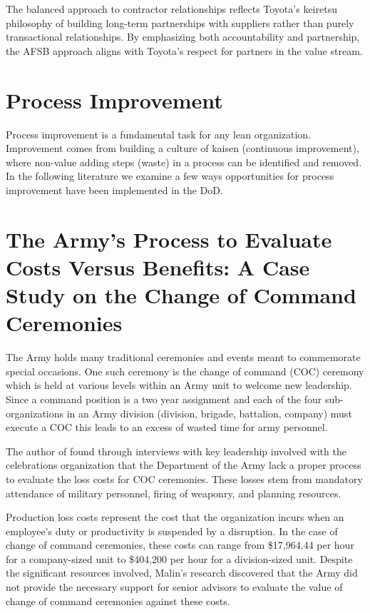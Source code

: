 \documentclass{article}
\begin{document}
		The balanced approach to contractor relationships reflects Toyota's keiretsu philosophy of building long-term partnerships with suppliers rather than purely transactional relationships. 
		By emphasizing both accountability and partnership, the AFSB approach aligns with Toyota's respect for partners in the value stream. 

	\section{Process Improvement}

		Process improvement is a fundamental task for any lean organization. 
		Improvement comes from building a culture of kaisen (continuous improvement), where non-value adding steps (waste) in a process can be identified and removed. In the following literature we examine a few ways opportunities for process improvement have been implemented in the DoD.

		\section{The Army's Process to Evaluate Costs Versus Benefits: A Case Study on the Change of Command Ceremonies \cite{Malin2020}}

			The Army holds many traditional ceremonies and events meant to commemorate special occasions. 
			One such ceremony is the change of command (COC) ceremony which is held at various levels within an Army unit to welcome new leadership. 
			Since a command position is a two year assignment and each of the four sub-organizations in an Army division (division, brigade, battalion, company) must execute a COC this leads to an excess of wasted time for army personnel.

			The author of \cite{Malin2020} found through interviews with key leadership involved with the celebrations organization that the Department of the Army lack a proper process to evaluate the loss costs for COC ceremonies.
			These losses stem from mandatory attendance of military personnel, firing of weaponry, and planning resources.

			Production loss costs represent the cost that the organization incurs when an employee's duty or productivity is suspended by a disruption. In the case of change of command ceremonies, these costs can range from \$17,964.44 per hour for a company-sized unit to \$404,200 per hour for a division-sized unit. 
			Despite the significant resources involved, Malin's research discovered that the Army did not provide the necessary support for senior advisors to evaluate the value of change of command ceremonies against these costs.
\end{document}
